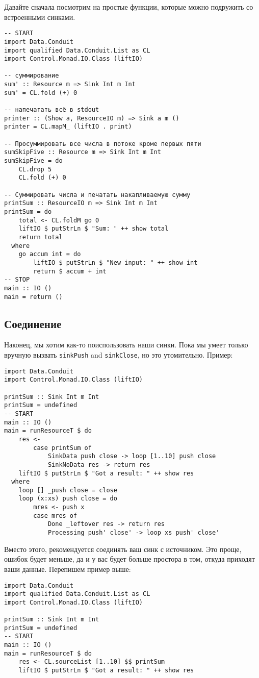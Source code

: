 Давайте сначала посмотрим на простые функции, которые можно подружить со встроенными
синками.
\begin{lstlisting}
-- START
import Data.Conduit
import qualified Data.Conduit.List as CL
import Control.Monad.IO.Class (liftIO)

-- суммирование
sum' :: Resource m => Sink Int m Int
sum' = CL.fold (+) 0

-- напечатать всё в stdout
printer :: (Show a, ResourceIO m) => Sink a m ()
printer = CL.mapM_ (liftIO . print)

-- Просуммировать все числа в потоке кроме первых пяти
sumSkipFive :: Resource m => Sink Int m Int
sumSkipFive = do
    CL.drop 5
    CL.fold (+) 0

-- Суммировать числа и печатать накапливаемую сумму
printSum :: ResourceIO m => Sink Int m Int
printSum = do
    total <- CL.foldM go 0
    liftIO $ putStrLn $ "Sum: " ++ show total
    return total
  where
    go accum int = do
        liftIO $ putStrLn $ "New input: " ++ show int
        return $ accum + int
-- STOP
main :: IO ()
main = return ()
\end{lstlisting}

\subsection{Соединение}
Наконец, мы хотим как-то поиспользовать наши синки. Пока мы умеет только вручную вызвать
\verb*|sinkPush| and \verb*|sinkClose|, но это утомительно. Пример:
\begin{lstlisting}
import Data.Conduit
import Control.Monad.IO.Class (liftIO)

printSum :: Sink Int m Int
printSum = undefined
-- START
main :: IO ()
main = runResourceT $ do
    res <-
        case printSum of
            SinkData push close -> loop [1..10] push close
            SinkNoData res -> return res
    liftIO $ putStrLn $ "Got a result: " ++ show res
  where
    loop [] _push close = close
    loop (x:xs) push close = do
        mres <- push x
        case mres of
            Done _leftover res -> return res
            Processing push' close' -> loop xs push' close'
\end{lstlisting}
Вместо этого, рекомендуется соединять ваш синк с источником. Это проще, 
ошибок будет меньше, да и у вас будет больше простора в том, откуда приходят ваши данные.
Перепишем пример выше:
\begin{lstlisting}
import Data.Conduit
import qualified Data.Conduit.List as CL
import Control.Monad.IO.Class (liftIO)

printSum :: Sink Int m Int
printSum = undefined
-- START
main :: IO ()
main = runResourceT $ do
    res <- CL.sourceList [1..10] $$ printSum
    liftIO $ putStrLn $ "Got a result: " ++ show res
\end{lstlisting}

